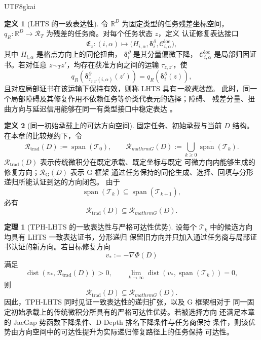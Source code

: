 \documentclass[12pt]{report}
\theoremstyle{definition}
\newtheorem{definition}{定义}[chapter]
\newtheorem{theorem}{定理}[chapter]
\newcommand{\RR}{\mathbb R}
\begin{document}
\begin{CJK*}{UTF8}{gkai}
\begin{definition}[LHTS 的一致表达性]
令 $\RR^D$ 为固定类型的任务残差坐标空间，
$q_R:\RR^D\to\mathcal R_T$ 为残差的任务商。对每个任务状态 $z$，定义
认证修复表达接口
\[
\mathfrak E_z:(i,\alpha)
\longmapsto
\bigl(H_{i,\alpha},\boldsymbol\delta_i^\partial,
\mathcal C_{i,\alpha}^{\mathrm{loc}}\bigr),
\]
其中 $H_{i,\alpha}$ 是格点方向上的同伦扭曲，
$\boldsymbol\delta_i^\partial$ 是其分量偏微下降，
$\mathcal C_{i,\alpha}^{\mathrm{loc}}$ 是局部归因证书。若对任意
$z\sim_Tz'$，均存在获准方向之间的运输 $\tau_{z,z'}$，使
\[
q_R\!\left(
\boldsymbol\delta_{\tau_{z,z'}(i,\alpha)}^\partial(z')
\right)
=
q_R\!\left(
\boldsymbol\delta_i^\partial(z)
\right),
\]
且对应局部证书在该运输下保持有效，则称 LHTS 具有\emph{一致表达性}。
此时，同一个局部障碍及其修复作用不依赖任务等价类代表元的选择；障碍、
残差分量、扭曲方向与延迟信用能够在同一有类型接口中稳定表达
\cite{lhts}。
\end{definition}

\begin{definition}[同一初始承载上的可达方向空间]
固定任务、初始承载与当前 $D$ 结构。在本章的比较规约下，令
\[
\mathcal R_{\mathrm{trad}}(D)
:=\operatorname{span}(\mathcal T_0),
\qquad
\mathcal R_{mathrm G}(D)
:=\overline{\bigcup_{k\geq0}\operatorname{span}(\mathcal T_k)}.
\]
$\mathcal R_{\mathrm{trad}}(D)$ 表示传统微积分在既定承载、既定坐标与既定
可微方向内能够生成的修复方向；$\mathcal R_{\mathrm G}(D)$ 表示 G 框架
通过任务保持的同伦生成、选择、回填与分形递归所能认证到达的方向闭包。
由于
\[
\operatorname{span}(\mathcal T_k)
\subseteq
\operatorname{span}(\mathcal T_{k+1}),
\]
必有
\[
\mathcal R_{\mathrm{trad}}(D)
\subseteq
\mathcal R_{mathrm G}(D).
\]
\end{definition}

\begin{theorem}[TPH-LHTS 的一致表达性与严格可达性优势]
\label{thm:tph-lhts-reachability-advantage}
设每个 $\mathcal T_k$ 中的候选方向均具有 LHTS 一致表达证书，分形递归
保留旧方向并只加入通过任务商与局部证书认证的新方向。若目标修复方向
\[
v_*:=-\nabla\Phi(D)
\]
满足
\[
\operatorname{dist}\!\left(v_*,\mathcal R_{\mathrm{trad}}(D)\right)>0,
\qquad
\lim_{k\to\infty}
\operatorname{dist}\!\left(
v_*,\operatorname{span}(\mathcal T_k)
\right)=0,
\]
则
\[
\mathcal R_{\mathrm{trad}}(D)
\subsetneq
\mathcal R_{mathrm G}(D).
\]
因此，TPH-LHTS 同时见证一致表达性的递归扩张，以及 G 框架相对于
同一固定初始承载上的传统微积分所具有的严格可达性优势。若被选择方向
还满足本章的 JacGap 势函数下降条件、D-Depth 排名下降条件与任务商保持
条件，则该优势由方向空间中的可达性提升为实际递归修复路径上的任务保持
可达性\cite{tphlhts}。
\end{theorem}


\end{CJK*}
\end{document}
